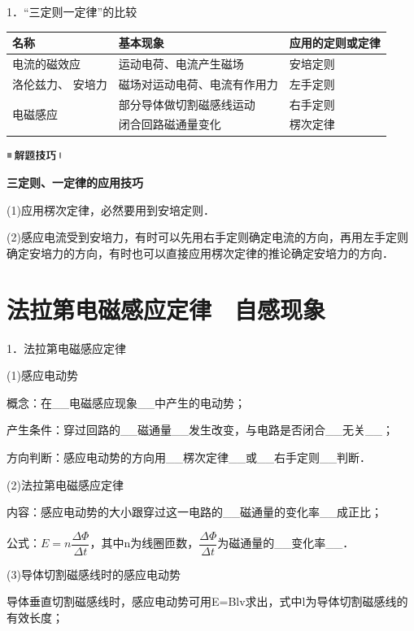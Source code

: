\documentclass[cn,10.5pt,chinese,mac,chinesefont=founder]{elegantbook}
\begin{document}
1．``三定则一定律''的比较

\begin{longtable}[]{@{}m{3cm}m{5cm}m{3cm}@{}}
\toprule
名称 & 基本现象 & 应用的定则或定律\tabularnewline
\midrule
\endhead
电流的磁效应 & 运动电荷、电流产生磁场 & 安培定则\tabularnewline
洛伦兹力、 安培力 & 磁场对运动电荷、电流有作用力 &
左手定则\tabularnewline
\multirow{2}{3cm}{电磁感应} & 部分导体做切割磁感线运动 & 右手定则\tabularnewline
& 闭合回路磁通量变化 & 楞次定律\tabularnewline
\bottomrule
\end{longtable}

\begin{center}\includegraphics[width=0.70764in,height=0.12292in]{media/image37.png}\end{center}
\begin{center}
	\textbf{三定则、一定律的应用技巧}
\end{center}

(1)应用楞次定律，必然要用到安培定则．

(2)感应电流受到安培力，有时可以先用右手定则确定电流的方向，再用左手定则确定安培力的方向，有时也可以直接应用楞次定律的推论确定安培力的方向．


\newpage
\section{法拉第电磁感应定律　自感现象}

1．法拉第电磁感应定律

(1)感应电动势

概念：在\_\_电磁感应现象\_\_中产生的电动势；

产生条件：穿过回路的\_\_磁通量\_\_发生改变，与电路是否闭合\_\_无关\_\_；

方向判断：感应电动势的方向用\_\_楞次定律\_\_或\_\_右手定则\_\_判断．

(2)法拉第电磁感应定律

内容：感应电动势的大小跟穿过这一电路的\_\_磁通量的变化率\_\_成正比；

公式：$E=n \dfrac{\Delta \Phi}{\Delta t}$，其中n为线圈匝数，$\dfrac{\Delta \Phi}{\Delta t}$为磁通量的\_\_变化率\_\_．

(3)导体切割磁感线时的感应电动势

导体垂直切割磁感线时，感应电动势可用E=Blv求出，式中l为导体切割磁感线的有效长度；
\end{document}

